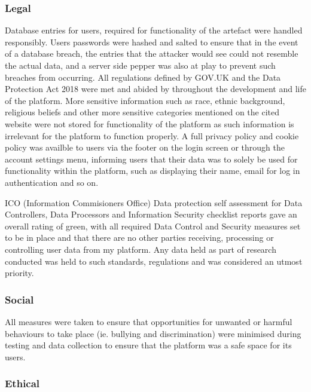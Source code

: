 \documentclass[lettersize,journal]{IEEEtran}
\begin{document}
	\subsubsection{Legal}
        Database entries for users, required for functionality of the artefact were handled responsibly. Users passwords were hashed and salted to ensure that in
	the event of a database breach,	the entries that the attacker would see could not resemble the actual data, and a server side pepper was also at play to
	prevent such breaches from occurring. All regulations defined by GOV.UK and the Data Protection Act 2018 \cite{Gov UK Data Protection} were met and abided by throughout
        the development and life of the platform. More sensitive information such as race, ethnic background, religious beliefs and other more
        sensitive categories mentioned on the cited website were not stored for functionality of the platform as such information
        is irrelevant for the platform to function properly. A full privacy policy and cookie policy was availble to users via the footer on the login screen or
	through the account settings menu, informing users that their data was to solely be used for functionality within the platform, such as displaying
	their name, email for log in authentication and so on.

        ICO (Information Commisioners Office) \cite{ICO} Data protection self assessment for Data Controllers, Data Processors and Information Security
        checklist reports gave an overall rating of green, with all required Data Control and Security measures set to be in place and that
        there are no other parties receiving, processing or controlling user data from my platform. Any data held as part of research conducted was held to such standards,
	regulations and was considered an utmost priority.

        \subsubsection{Social}
                All measures were taken to ensure that opportunities for unwanted or harmful behaviours to take place (ie. bullying and discrimination)
                were minimised during testing and data collection to ensure that the platform was a safe space for its users.

        \subsubsection{Ethical}
\end{document}
